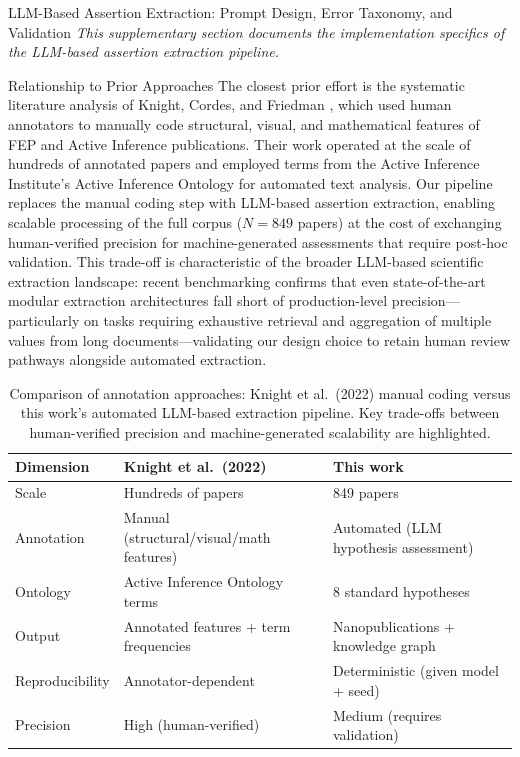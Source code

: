 \documentclass[
  ignorenonframetext,
]{beamer}
\author{\texorpdfstring{}{}}
\date{}
\begin{document}
\begin{frame}[fragile]{LLM-Based Assertion Extraction: Prompt Design,
Error Taxonomy, and Validation \label{sec:extraction_pipeline}}
\protect{}\label{llm-based-assertion-extraction-prompt-design-error-taxonomy-and-validation}
\emph{This supplementary section documents the implementation specifics
of the LLM-based assertion extraction pipeline.}

\begin{block}{Relationship to Prior Approaches}
\protect{}\label{relationship-to-prior-approaches}
The closest prior effort is the systematic literature analysis of
Knight, Cordes, and Friedman \citep{knight2022fep}, which used human
annotators to manually code structural, visual, and mathematical
features of FEP and Active Inference publications. Their work operated
at the scale of hundreds of annotated papers and employed terms from the
Active Inference Institute's Active Inference Ontology for automated
text analysis. Our pipeline replaces the manual coding step with
LLM-based assertion extraction, enabling scalable processing of the full
corpus (\(N = 849\) papers) at the cost of exchanging human-verified
precision for machine-generated assessments that require post-hoc
validation. This trade-off is characteristic of the broader LLM-based
scientific extraction landscape: recent benchmarking confirms that even
state-of-the-art modular extraction architectures fall short of
production-level precision---particularly on tasks requiring exhaustive
retrieval and aggregation of multiple values from long
documents---validating our design choice to retain human review pathways
alongside automated extraction.

\begin{table}[htbp]
\centering
\caption{Comparison of annotation approaches: Knight et al.\ (2022) manual coding versus this work's automated LLM-based extraction pipeline. Key trade-offs between human-verified precision and machine-generated scalability are highlighted.}
\label{tab:annotation_comparison}
\begin{tabular}{lll}
\toprule
\textbf{Dimension} & \textbf{Knight et al.\ (2022)} & \textbf{This work} \\
\midrule
Scale & Hundreds of papers & 849 papers \\
Annotation & Manual (structural/visual/math features) & Automated (LLM hypothesis assessment) \\
Ontology & Active Inference Ontology terms & 8 standard hypotheses \\
Output & Annotated features + term frequencies & Nanopublications + knowledge graph \\
Reproducibility & Annotator-dependent & Deterministic (given model + seed) \\
Precision & High (human-verified) & Medium (requires validation) \\
\bottomrule
\end{tabular}
\end{table}


\end{block}
\end{frame}
\end{document}
